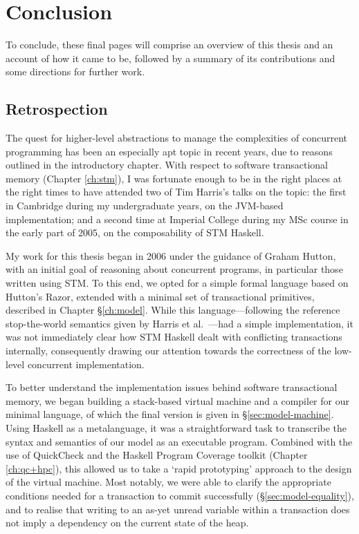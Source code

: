 \chapter{Conclusion}

To conclude, these final pages will comprise an overview of this thesis and
an account of how it came to be, followed by a summary of its contributions
and some directions for further work.

\section{Retrospection}%

The quest for higher-level abstractions to manage the complexities of
concurrent programming has been an especially apt topic in recent years, due
to reasons outlined in the introductory chapter. With respect to software
transactional memory (Chapter \ref{ch:stm}), I was fortunate enough to be in
the right places at the right times to have attended two of Tim Harris's
talks on the topic: the first in Cambridge during my undergraduate years, on
the JVM-based implementation; and a second time at Imperial College during
my MSc course in the early part of 2005, on the composability of STM
Haskell.

My work for this thesis began in 2006 under the guidance of Graham Hutton,
with an initial goal of reasoning about concurrent programs, in particular
those written using STM. To this end, we opted for a simple formal language
based on Hutton's Razor, extended with a minimal set of transactional
primitives, described in Chapter \S\ref{ch:model}. While this
language---following the reference stop-the-world semantics given by Harris
et al.~\cite{harris05-composable}---had a simple implementation, it was not
immediately clear how STM Haskell dealt with conflicting transactions
internally, consequently drawing our attention towards the correctness of
the low-level concurrent implementation.

To better understand the implementation issues behind software transactional
memory, we began building a stack-based virtual machine and a compiler for
our minimal language, of which the final version is given in
\S\ref{sec:model-machine}. Using Haskell as a metalanguage, it was
a straightforward task to transcribe the syntax and semantics of our model
as an executable program. Combined with the use of QuickCheck and the
Haskell Program Coverage toolkit (Chapter \ref{ch:qc+hpc}), this allowed us
to take a `rapid prototyping' approach to the design of the virtual machine.
Most notably, we were able to clarify the appropriate conditions needed for
a transaction to commit successfully (\S\ref{sec:model-equality}), and to
realise that writing to an as-yet unread variable within a transaction does
not imply a dependency on the current state of the heap.

